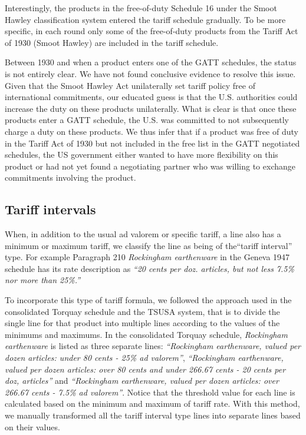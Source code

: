 \documentclass[
  12pt,
]{article}
\begin{document}
Interestingly, the products in the free-of-duty Schedule 16 under the Smoot Hawley classification system entered the tariff schedule gradually. To be more specific, in each round only some of the free-of-duty products from the Tariff Act of 1930 (Smoot Hawley) are included in the tariff schedule.

Between 1930 and when a product enters one of the GATT schedules, the status is not entirely clear. We have not found conclusive evidence to resolve this issue. Given that the Smoot Hawley Act unilaterally set tariff policy free of international commitments, our educated guess is that the U.S. authorities could increase the duty on these products unilaterally. What is clear is that once these products enter a GATT schedule, the U.S. was committed to not subsequently charge a duty on these products. We thus infer that if a product was free of duty in the Tariff Act of 1930 but not included in the free list in the GATT negotiated schedules, the US government either wanted to have more flexibility on this product or had not yet found a negotiating partner who was willing to exchange commitments involving the product.

\hypertarget{int}{%
\subsection{Tariff intervals}\label{int}}

When, in addition to the usual ad valorem or specific tariff, a line also has a minimum or maximum tariff, we classify the line as being of the``tariff interval'' type. For example Paragraph 210 \emph{Rockingham earthenware} in the Geneva 1947 schedule has its rate description as \emph{``20 cents per doz. articles, but not less 7.5\% nor more than 25\%.''}

To incorporate this type of tariff formula, we followed the approach used in the consolidated Torquay schedule and the TSUSA system, that is to divide the single line for that product into multiple lines according to the values of the minimums and maximums. In the consolidated Torquay schedule, \emph{Rockingham earthenware} is listed as three separate lines: \emph{``Rockingham earthenware, valued per dozen articles: under 80 cents - 25\% ad valorem''}, \emph{``Rockingham earthenware, valued per dozen articles: over 80 cents and under 266.67 cents - 20 cents per doz, articles''} and \emph{``Rockingham earthenware, valued per dozen articles: over 266.67 cents - 7.5\% ad valorem''}. Notice that the threshold value for each line is calculated based on the minimum and maximum of tariff rate. With this method, we manually transformed all the tariff interval type lines into separate lines based on their values.
\end{document}
